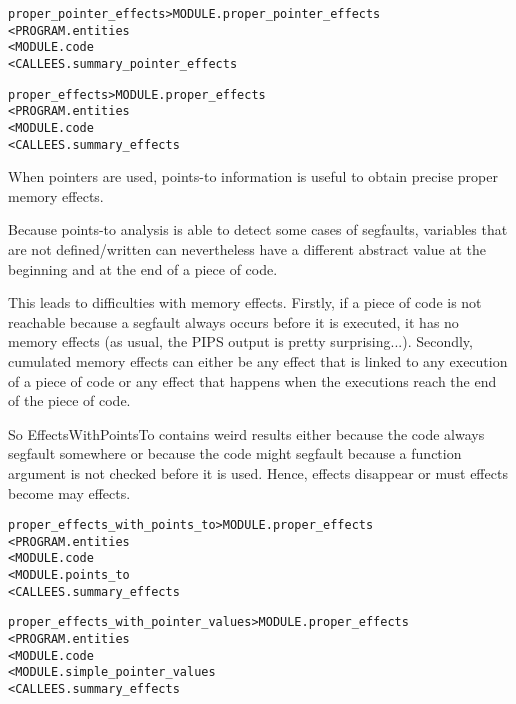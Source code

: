 \documentclass[a4paper]{report}
\newenvironment{PipsMake}{\begin{alltt}}{\end{alltt}}
\begin{document}
\begin{PipsMake}
proper_pointer_effects                  > MODULE.proper_pointer_effects
        < PROGRAM.entities
        < MODULE.code
        < CALLEES.summary_pointer_effects
\end{PipsMake}

\begin{PipsMake}
proper_effects                  > MODULE.proper_effects
        < PROGRAM.entities
        < MODULE.code
        < CALLEES.summary_effects
\end{PipsMake}

When pointers are used, points-to information is useful to obtain
precise proper memory effects.

Because points-to analysis is able to detect some cases of segfaults,
variables that are not defined/written can nevertheless have a
different abstract value at the beginning and at the end of a piece of
code.

This leads to difficulties with memory effects. Firstly, if a piece of
code is not reachable because a segfault always occurs before it is
executed, it has no memory effects (as usual, the PIPS output is
pretty surprising...). Secondly, cumulated memory effects can either
be any effect that is linked to any execution of a piece of code or
any effect that happens when the executions reach the end of the piece
of code.

So EffectsWithPointsTo contains weird results either because the code
always segfault somewhere or because the code might segfault because a
function argument is not checked before it is used. Hence, effects
disappear or must effects become may effects.

\begin{PipsMake}
proper_effects_with_points_to > MODULE.proper_effects
        < PROGRAM.entities
        < MODULE.code
        < MODULE.points_to
        < CALLEES.summary_effects
\end{PipsMake}

%
%

\begin{PipsMake}
proper_effects_with_pointer_values > MODULE.proper_effects
        < PROGRAM.entities
        < MODULE.code
        < MODULE.simple_pointer_values
        < CALLEES.summary_effects
\end{PipsMake}
\end{document}

